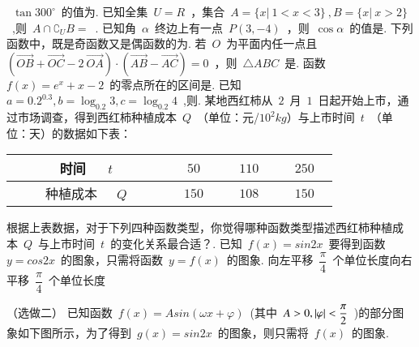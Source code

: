 \documentclass[printbox]{BHCexam}
\begin{document}
\maketitle
\notice
\begin{questions}

\xuanze
\question ~$\tan 300^{\circ}$~的值为\xx.
\question 已知全集~$U=R$~，集合~$A=\{ x|~1<x<3 \}~,B=\{ x|~x>2 \}$~,则~$A\cap \complement _U B=$~\xx.
\question 已知角~$\alpha$~终边上有一点~$P(3,-4)$~，则~$\cos \alpha$~的值是\xx.
\question 下列函数中，既是奇函数又是偶函数的为\xx.
\question 若~$O$~为平面内任一点且~$(\overrightarrow{OB}+\overrightarrow{OC}-2~\overrightarrow{OA})\cdot (\overrightarrow{AB}-\overrightarrow{AC})=0$~，则~$\triangle ABC$~是\xx.
\question 函数~$f(x)=e^x+x-2$~的零点所在的区间是\xx.
\question 已知~$a=0.2^{0.3},b=\log_{0.2} 3,c=\log_{0.2} 4$~,则\xx.
\question 某地西红柿从~$2$~月~$1$~日起开始上市，通过市场调查，得到西红柿种植成本~$Q$~（单位：元/$10^2 kg$）与上市时间~$t$~（单位：天）的数据如下表：
\begin{center}
\begin{tabular}{|c|c|c|c|}
\hline
~~~~~时间~~~$t$~~~~~&$~~~~50~~~~$&$~~~~110~~~~$&$~~~~250~~~~$\\
\hline
~~~~~种植成本~~~$Q$~~~~~&$~~~~150~~~~$&$~~~~108~~~~$&$~~~~150~~~~$\\
\hline
\end{tabular}
\end{center}
根据上表数据，对于下列四种函数类型，你觉得哪种函数类型描述西红柿种植成本~$Q$~与上市时间~$t$~的变化关系最合适？\xx.
 已知~$f(x)=sin {2x}$~要得到函数~$y=cos {2x}$~的图象，只需将函数~$y=f(x)$~的图象\xx.
{向左平移~$\dfrac{\pi}{4}$~个单位长度}{向右平移~$\dfrac{\pi}{4}$~个单位长度}
\begin{minipage}[b]{0.7\linewidth}
{\kaishu（选做二）} 已知函数~$f(x)=A sin(\omega x+\varphi)$~(其中~$A>0,\left| \varphi \right|<\dfrac{\pi}{2}$~)的部分图象如下图所示，为了得到~$g(x)=sin {2 x}$~的图象，则只需将~$f(x)$~的图象\xx.

\end{minipage}
\end{questions}
\end{document}
